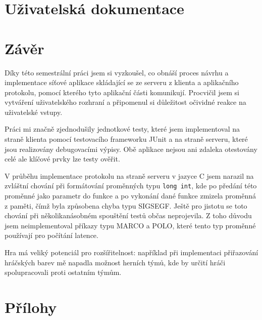 \documentclass[12pt,a4paper]{article}
\let\oldsection\section
\renewcommand\section{\clearpage\oldsection}
\begin{document}
\section{Uživatelská dokumentace}

\section{Závěr}
Díky této semestrální práci jsem si vyzkoušel, co obnáší proces návrhu a implementace síťové aplikace skládající se ze serveru z klienta a aplikačního protokolu, pomocí kterého tyto aplikační části komunikují.
Procvičil jsem si vytváření uživatelského rozhraní a připomenul si důležitost očividné reakce na uživatelské vstupy.

Práci mi značně zjednodušily jednotkové testy, které jsem implementoval na straně klienta pomocí testovacího frameworku JUnit a na straně serveru, které jsou realizovány debugovacími výpisy. Obě aplikace nejsou ani zdaleka otestovány celé ale klíčové prvky lze testy ověřit.

V průběhu implementace protokolu na straně serveru v jazyce C jsem narazil na zvláštní chování při formátování proměnných typu \texttt{long int}, kde po předání této proměnné jako parametr do funkce a po vykonání dané funkce zmizela proměnná z paměti, čímž byla způsobena chyba typu SIGSEGF. Ještě pro jistotu se toto chování při několikanásobném spouštění testů občas neprojevila. Z toho důvodu jsem neimplementoval příkazy typu MARCO a POLO, které tento typ proměnné používají pro počítání latence.

Hra má veliký potenciál pro rozšířitelnost: například při implementaci přiřazování hráčských barev mě napadla možnost herních týmů, kde by určití hráči spolupracovali proti ostatním týmům.
\section{Přílohy}
\end{document}
